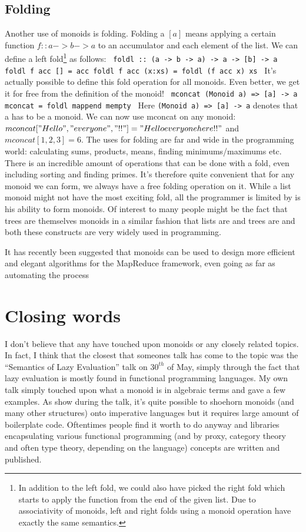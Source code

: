 \documentclass{acm_proc_article-sp}
\begin{document}
{\begin{itemize}
\subsection{Folding}
Another use of monoids is folding. Folding a $[a]$ means applying a
certain function $f :: a -> b -> a$ to an accumulator and each element
of the list. We can define a left fold\footnote{In addition to the
  left fold, we could also have picked the right fold which starts to
  apply the function from the end of the given list. Due to
  associativity of monoids, left and right folds using a monoid
  operation have exactly the same semantics.} as follows:
\texttt{
foldl :: (a -> b -> a) -> a -> [b] -> a
foldl f acc [] = acc
foldl f acc (x:xs) = foldl (f acc x) xs
}
It's actually possible to define this fold operation for all
monoids. Even better, we get it for free from the definition of the
monoid!
\texttt{
mconcat (Monoid a) => [a] -> a
mconcat = foldl mappend mempty
}
Here \texttt{(Monoid a) => [a] -> a} denotes that a has to be a
monoid. We can now use mconcat on any monoid: $mconcat ["Hello ",
"everyone ", "!!"] = "Hello everyone here!!"$ and $mconcat [1, 2, 3] =
6$. The uses for folding are far and wide in the programming world:
calculating sums, products, means, finding minimums/maximums etc. There is an
incredible amount of operations that can be done with a fold, even
including sorting and finding primes\cite{haskell:fold}. It's
therefore quite convenient that for any monoid we can form, we always
have a free folding operation on it. While a list monoid might not
have the most exciting fold, all the programmer is limited by is his
ability to form monoids. Of interest to many people might be the fact
that trees are themselves monoids in a similar fashion that lists are
and trees are and both these constructs are very widely used in programming.

It has recently been suggested that monoids can be used to design more
efficient and elegant algorithms for the MapReduce framework, even
going as far as automating the process\cite{Lin:monodify}

\section{Closing words}
I don't believe that any have touched upon monoids or any closely
related topics. In fact, I think that the closest that someones talk
has come to the topic was the ``Semantics of Lazy Evaluation'' talk on
$30^{th}$ of May, simply through the fact that lazy evaluation is
mostly found in functional programming languages. My own talk simply
touched upon what a monoid is in algebraic terms and gave a few
examples. As show during the talk, it's quite possible to shoehorn
monoids (and many other structures) onto imperative languages but it
requires large amount of boilerplate code. Oftentimes people find it
worth to do anyway and libraries encapsulating various functional
programming (and by proxy, category theory and often type theory,
depending on the language) concepts are written and
published\cite{java:functional}.


\end{itemize}}
\end{document}
